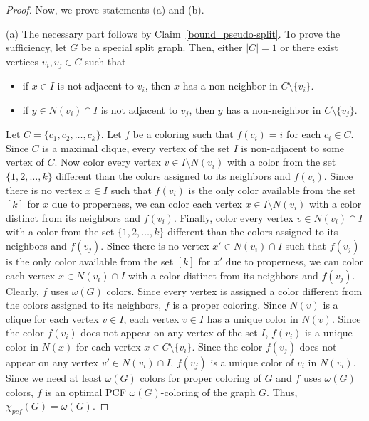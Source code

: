 \documentclass[10pt,a4paper]{amsart}
\begin{document}
\begin{proof}
	Now, we prove statements (a) and (b).
	
	\medskip
	
	(a) The necessary part follows by Claim~\ref{bound_pseudo-split}. To prove the sufficiency, let $G$ be a special split graph. Then, either $|C| = 1$ or there exist vertices $v_i, v_j \in C$ such that 
	\begin{itemize}
		\item if $x\in I$ is not adjacent to $v_i$, then $x$ has a non-neighbor in $C\setminus\{v_i\}$.
		\item if $y\in N(v_i)\cap I$ is not adjacent to $v_j$, then $y$ has a non-neighbor in $C\setminus\{v_j\}$.
	\end{itemize}
	
	Let $C = \{c_1, c_2, \ldots, c_k\}$.
	Let $f$ be a coloring such that $f(c_i) = i$ for each $c_i \in C$. Since $C$ is a maximal clique, every vertex of the set $I$ is non-adjacent to some vertex of $C$. Now color every vertex $v\in I\setminus N(v_i)$ with a color from the set $\{1, 2, \ldots, k\}$ different than the colors assigned to its neighbors and $f(v_i)$. Since there is no vertex $x\in I$ such that $f(v_i)$ is the only color available from the set $[k]$ for $x$ due to properness, we can color each vertex $x\in I\setminus N(v_i)$ with a color distinct from its neighbors and $f(v_i)$. 
	Finally, color every vertex $v\in N(v_i)\cap I$ with a color from the set $\{1, 2, \ldots, k\}$ different than the colors assigned to its neighbors and $f(v_j)$. Since there is no vertex $x'\in N(v_i)\cap I$ such that $f(v_j)$ is the only color available from the set $[k]$ for $x'$ due to properness, we can color each vertex $x\in N(v_i)\cap I$ with a color distinct from its neighbors and $f(v_j)$. 
	Clearly, $f$ uses $\omega(G)$ colors. Since every vertex is assigned a color different from the colors assigned to its neighbors, $f$ is a proper coloring. Since $N(v)$ is a clique for each vertex $v\in I$, each vertex $v\in I$ has a unique color in $N(v)$. Since the color $f(v_i)$ does not appear on any vertex of the set $I$, $f(v_i)$ is a unique color in $N(x)$ for each vertex $x\in C\setminus\{v_i\}$. Since the color $f(v_j)$ does not appear on any vertex $v'\in N(v_i)\cap I$, $f(v_j)$ is a unique color of $v_i$ in $N(v_i)$. Since we need at least $\omega(G)$ colors for proper coloring of $G$ and $f$ uses $\omega(G)$ colors, $f$ is an optimal PCF $\omega(G)$-coloring of the graph $G$. Thus, $\chi_{pcf}(G) = \omega(G)$.
	
	\medskip
	

\end{proof}
\end{document}
